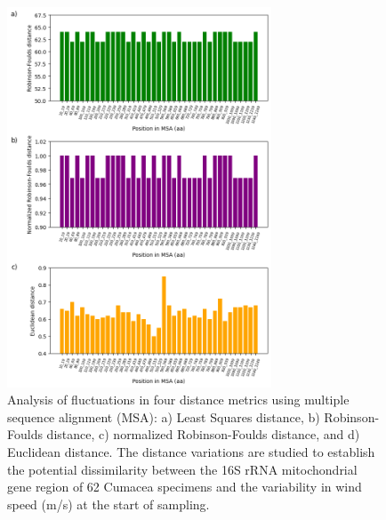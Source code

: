 {\begin{figure}[]
    \centering
    \includegraphics[width=0.7\textwidth]{figure5.png}
     \caption{Analysis of fluctuations in four distance metrics using multiple sequence alignment (MSA): a) Least Squares distance, b) Robinson-Foulds distance, c) normalized Robinson-Foulds distance, and d) Euclidean distance. The distance variations are studied to establish the potential dissimilarity between the 16S rRNA mitochondrial gene region of 62 Cumacea specimens and the variability in wind speed (m/s) at the start of sampling. \label{fig:fig6}}
\end{figure}

}
